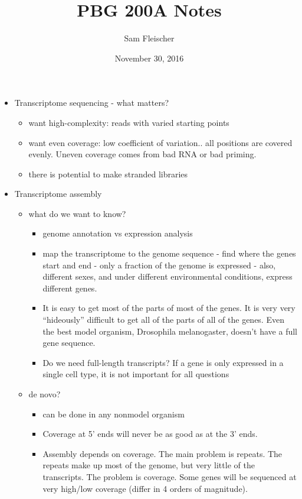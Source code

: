 \documentclass{article}
\title{PBG 200A Notes}
\author{Sam Fleischer}
\date{November 30, 2016}
\begin{document}
    \maketitle

    \begin{itemize}
        \item Transcriptome sequencing - what matters?
        \begin{itemize}
            \item want high-complexity: reads with varied starting points
            \item want even coverage: low coefficient of variation.. all positions are covered evenly.  Uneven coverage comes from bad RNA or bad priming.
            \item there is potential to make stranded libraries
        \end{itemize}
        \item Transcriptome assembly
        \begin{itemize}
            \item what do we want to know?
            \begin{itemize}
                \item genome annotation vs expression analysis
                \item map the transcriptome to the genome sequence - find where the genes start and end - only a fraction of the genome is expressed - also, different sexes, and under different environmental conditions, express different genes.
                \item It is easy to get most of the parts of most of the genes.  It is very very ``hideously'' difficult to get all of the parts of all of the genes.  Even the best model organism, Drosophila melanogaster, doesn't have a full gene sequence.
                \item Do we need full-length transcripts?  If a gene is only expressed in a single cell type, it is not important for all questions
            \end{itemize}
            \item de novo?
            \begin{itemize}
                \item can be done in any nonmodel organism
                \item Coverage at 5' ends will never be as good as at the 3' ends.
                \item Assembly depends on coverage.  The main problem is repeats.  The repeats make up most of the genome, but very little of the transcripts.  The problem is coverage.  Some genes will be sequenced at very high/low coverage (differ in 4 orders of magnitude).

\end{itemize}
\end{itemize}
\end{itemize}
\end{document}
